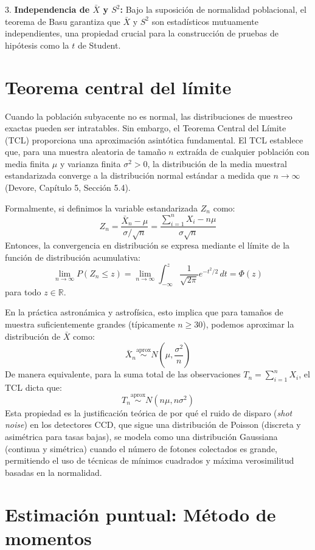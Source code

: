 3. \textbf{Independencia de $\bar{X}$ y $S^2$:}
Bajo la suposición de normalidad poblacional, el teorema de Basu garantiza que $\bar{X}$ y $S^2$ son estadísticos mutuamente independientes, una propiedad crucial para la construcción de pruebas de hipótesis como la $t$ de Student.

\section{Teorema central del límite}

Cuando la población subyacente no es normal, las distribuciones de muestreo exactas pueden ser intratables. Sin embargo, el Teorema Central del Límite (TCL) proporciona una aproximación asintótica fundamental. El TCL establece que, para una muestra aleatoria de tamaño $n$ extraída de cualquier población con media finita $\mu$ y varianza finita $\sigma^2 > 0$, la distribución de la media muestral estandarizada converge a la distribución normal estándar a medida que $n \to \infty$ (Devore, Capítulo 5, Sección 5.4).

Formalmente, si definimos la variable estandarizada $Z_n$ como:
$$ Z_n = \frac{\bar{X}_n - \mu}{\sigma / \sqrt{n}} = \frac{\sum_{i=1}^{n} X_i - n\mu}{\sigma \sqrt{n}} $$
Entonces, la convergencia en distribución se expresa mediante el límite de la función de distribución acumulativa:
$$ \lim_{n \to \infty} P(Z_n \le z) = \lim_{n \to \infty} \int_{-\infty}^{z} \frac{1}{\sqrt{2\pi}} e^{-t^2/2} \, dt = \Phi(z) $$
para todo $z \in \mathbb{R}$. 

En la práctica astronámica y astrofísica, esto implica que para tamaños de muestra suficientemente grandes (típicamente $n \ge 30$), podemos aproximar la distribución de $\bar{X}$ como:
$$ \bar{X}_n \overset{\text{aprox}}{\sim} N\left(\mu, \frac{\sigma^2}{n}\right) $$
De manera equivalente, para la suma total de las observaciones $T_n = \sum_{i=1}^n X_i$, el TCL dicta que:
$$ T_n \overset{\text{aprox}}{\sim} N(n\mu, n\sigma^2) $$
Esta propiedad es la justificación teórica de por qué el ruido de disparo (\textit{shot noise}) en los detectores CCD, que sigue una distribución de Poisson (discreta y asimétrica para tasas bajas), se modela como una distribución Gaussiana (continua y simétrica) cuando el número de fotones colectados es grande, permitiendo el uso de técnicas de mínimos cuadrados y máxima verosimilitud basadas en la normalidad.

\section{Estimación puntual: Método de momentos}

